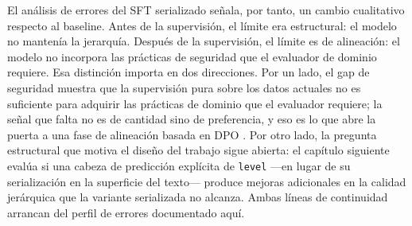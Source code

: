 El análisis de errores del SFT serializado señala, por tanto, un cambio cualitativo respecto
al baseline. Antes de la supervisión, el límite era estructural: el modelo no mantenía la
jerarquía. Después de la supervisión, el límite es de alineación: el modelo no incorpora las
prácticas de seguridad que el evaluador de dominio requiere. Esa distinción importa en dos direcciones. Por un lado, el gap de seguridad muestra que la
supervisión pura sobre los datos actuales no es suficiente para adquirir las prácticas de
dominio que el evaluador requiere; la señal que falta no es de cantidad sino de preferencia,
y eso es lo que abre la puerta a una fase de alineación basada en DPO \citep{rafailov2023dpo, xu2024dpoPpo}. Por otro lado, la
pregunta estructural que motiva el diseño del trabajo sigue abierta: el capítulo siguiente
evalúa si una cabeza de predicción explícita de \texttt{level} ---en lugar de su serialización
en la superficie del texto--- produce mejoras adicionales en la calidad jerárquica que la
variante serializada no alcanza. Ambas líneas de continuidad arrancan del perfil de errores
documentado aquí.
